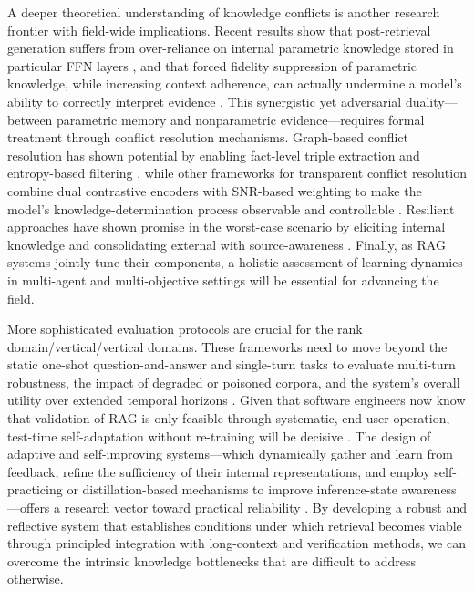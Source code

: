 \documentclass[11pt,a4paper]{article}
\begin{document}
A deeper theoretical understanding of knowledge conflicts is another research frontier with field-wide implications. Recent results show that post-retrieval generation suffers from over-reliance on internal parametric knowledge stored in particular FFN layers \cite{arxiv:2502.15543v4}, and that forced fidelity suppression of parametric knowledge, while increasing context adherence, can actually undermine a model's ability to correctly interpret evidence \cite{arxiv:2506.08938v2}. This synergistic yet adversarial duality---between parametric memory and nonparametric evidence---requires formal treatment through conflict resolution mechanisms. Graph-based conflict resolution has shown potential by enabling fact-level triple extraction and entropy-based filtering \cite{arxiv:2511.10375v1}, while other frameworks for transparent conflict resolution combine dual contrastive encoders with SNR-based weighting to make the model's knowledge-determination process observable and controllable \cite{arxiv:2601.06842v1}. Resilient approaches have shown promise in the worst-case scenario by eliciting internal knowledge and consolidating external with source-awareness \cite{arxiv:2410.07176v2}. Finally, as RAG systems jointly tune their components, a holistic assessment of learning dynamics in multi-agent and multi-objective settings will be essential for advancing the field.

More sophisticated evaluation protocols are crucial for the rank domain/vertical/vertical domains. These frameworks need to move beyond the static one-shot question-and-answer and single-turn tasks to evaluate multi-turn robustness, the impact of degraded or poisoned corpora, and the system's overall utility over extended temporal horizons \cite{arxiv:2401.05856v1}. Given that software engineers now know that validation of RAG is only feasible through systematic, end-user operation, test-time self-adaptation without re-training will be decisive \cite{arxiv:2401.05856v1}. The design of adaptive and self-improving systems---which dynamically gather and learn from feedback, refine the sufficiency of their internal representations, and employ self-practicing or distillation-based mechanisms to improve inference-state awareness---offers a research vector toward practical reliability \cite{arxiv:2505.02811v2}. By developing a robust and reflective system that establishes conditions under which retrieval becomes viable through principled integration with long-context and verification methods, we can overcome the intrinsic knowledge bottlenecks that are difficult to address otherwise.
\end{document}
